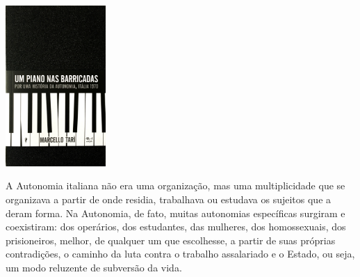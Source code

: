 {\vfill

\hspace*{-.4cm}\begin{minipage}[c]{1\linewidth}
\small{
{}}
\end{minipage}

\pagebreak

\hspace{.5cm}

\begin{center}
\hspace*{-2.7cm}
\hspace*{2.5cm}\includegraphics[width=38mm]{./imgs/barricada.png}
\end{center}

\hspace*{-7cm}\hrulefill\hspace*{-7cm}

\medskip

\noindent{}A Autonomia italiana não era uma organização, mas uma multiplicidade que se organizava a partir de onde residia, trabalhava ou estudava os sujeitos que a deram forma. Na Autonomia, de fato, muitas autonomias específicas surgiram e coexistiram: dos operários, dos estudantes, das mulheres, dos homossexuais, dos prisioneiros, melhor, de qualquer um que escolhesse, a partir de suas próprias contradições, o caminho da luta contra o trabalho assalariado e o Estado, ou seja, um modo reluzente de subversão da vida.

}
